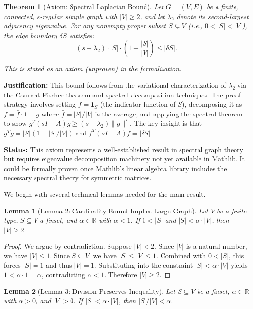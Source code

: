 \documentclass[11pt]{article}
\theoremstyle{plain}
\newtheorem*{theorem}{Theorem}
\newtheorem*{lemma}{Lemma}
\theoremstyle{definition}
\theoremstyle{remark}
\begin{document}
\begin{theorem}[Axiom: Spectral Laplacian Bound]
Let $G = (V, E)$ be a finite, connected, $s$-regular simple graph with $|V| \geq 2$, and let $\lambda_2$ denote its second-largest adjacency eigenvalue. For any nonempty proper subset $S \subsetneq V$ (i.e., $0 < |S| < |V|$), the edge boundary $\delta S$ satisfies:
\[
(s - \lambda_2) \cdot |S| \cdot \left(1 - \frac{|S|}{|V|}\right) \leq |\delta S|.
\]

\textit{This is stated as an axiom (unproven) in the formalization.}
\end{theorem}

\textbf{Justification:} This bound follows from the variational characterization of $\lambda_2$ via the Courant-Fischer theorem and spectral decomposition techniques. The proof strategy involves setting $f = \mathbf{1}_S$ (the indicator function of $S$), decomposing it as $f = \bar{f} \cdot \mathbf{1} + g$ where $\bar{f} = |S|/|V|$ is the average, and applying the spectral theorem to show $g^T(sI - A)g \geq (s - \lambda_2) \|g\|^2$. The key insight is that $g^T g = |S|(1 - |S|/|V|)$ and $f^T(sI - A)f = |\delta S|$.

\textbf{Status:} This axiom represents a well-established result in spectral graph theory but requires eigenvalue decomposition machinery not yet available in Mathlib. It could be formally proven once Mathlib's linear algebra library includes the necessary spectral theory for symmetric matrices.

We begin with several technical lemmas needed for the main result.

\begin{lemma}[Lemma 2: Cardinality Bound Implies Large Graph]
Let $V$ be a finite type, $S \subseteq V$ a finset, and $\alpha \in \mathbb{R}$ with $\alpha < 1$. If $0 < |S|$ and $|S| < \alpha \cdot |V|$, then $|V| \geq 2$.
\end{lemma}

\begin{proof}
We argue by contradiction. Suppose $|V| < 2$. Since $|V|$ is a natural number, we have $|V| \leq 1$. Since $S \subseteq V$, we have $|S| \leq |V| \leq 1$. Combined with $0 < |S|$, this forces $|S| = 1$ and thus $|V| = 1$. Substituting into the constraint $|S| < \alpha \cdot |V|$ yields $1 < \alpha \cdot 1 = \alpha$, contradicting $\alpha < 1$. Therefore $|V| \geq 2$.
\end{proof}

\begin{lemma}[Lemma 3: Division Preserves Inequality]
Let $S \subseteq V$ be a finset, $\alpha \in \mathbb{R}$ with $\alpha > 0$, and $|V| > 0$. If $|S| < \alpha \cdot |V|$, then $|S| / |V| < \alpha$.
\end{lemma}
\end{document}
